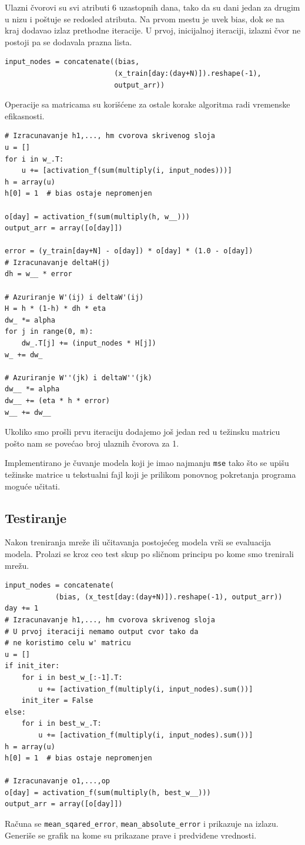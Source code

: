 \documentclass[a4paper]{article}
\begin{document}
Ulazni čvorovi su svi atributi 6 uzastopnih dana, tako da su dani jedan za drugim u nizu i poštuje se redosled atributa. Na prvom mestu je uvek bias, dok se na kraj dodavao izlaz prethodne iteracije. U prvoj, inicijalnoj iteraciji, izlazni čvor ne postoji pa se dodavala prazna lista.
\begin{verbatim}
input_nodes = concatenate((bias, 
                          (x_train[day:(day+N)]).reshape(-1), 
                          output_arr))
\end{verbatim}

Operacije sa matricama su korišćene za ostale korake algoritma radi vremenske efikasnosti.
\begin{verbatim}
# Izracunavanje h1,..., hm cvorova skrivenog sloja
u = []
for i in w_.T:
    u += [activation_f(sum(multiply(i, input_nodes)))]
h = array(u)
h[0] = 1  # bias ostaje nepromenjen

o[day] = activation_f(sum(multiply(h, w__)))
output_arr = array([o[day]])

error = (y_train[day+N] - o[day]) * o[day] * (1.0 - o[day])
# Izracunavanje deltaH(j)
dh = w__ * error

# Azuriranje W'(ij) i deltaW'(ij)
H = h * (1-h) * dh * eta
dw_ *= alpha
for j in range(0, m):
    dw_.T[j] += (input_nodes * H[j])
w_ += dw_

# Azuriranje W''(jk) i deltaW''(jk)
dw__ *= alpha
dw__ += (eta * h * error)
w__ += dw__
\end{verbatim}

Ukoliko smo prošli prvu iteraciju dodajemo još jedan red u težinsku matricu pošto nam se povećao broj ulaznih čvorova za 1.

Implementirano je čuvanje modela koji je imao najmanju \texttt{mse} tako što se upišu težinske matrice u tekstualni fajl koji je prilikom ponovnog pokretanja programa moguće učitati.

\subsection{Testiranje}
Nakon treniranja mreže ili učitavanja postojećeg modela vrši se evaluacija modela. Prolazi se kroz ceo test skup po sličnom principu po kome smo trenirali mrežu.
\begin{verbatim}
input_nodes = concatenate(
            (bias, (x_test[day:(day+N)]).reshape(-1), output_arr))
day += 1
# Izracunavanje h1,..., hm cvorova skrivenog sloja
# U prvoj iteraciji nemamo output cvor tako da 
# ne koristimo celu w' matricu
u = []
if init_iter:
    for i in best_w_[:-1].T:
        u += [activation_f(multiply(i, input_nodes).sum())]
    init_iter = False
else:
    for i in best_w_.T:
        u += [activation_f(multiply(i, input_nodes).sum())]
h = array(u)
h[0] = 1  # bias ostaje nepromenjen

# Izracunavanje o1,...,op
o[day] = activation_f(sum(multiply(h, best_w__)))
output_arr = array([o[day]])
\end{verbatim}
Računa se \texttt{mean\_sqared\_error}, \texttt{mean\_absolute\_error} i prikazuje na izlazu. Generiše se grafik na kome su prikazane prave i predviđene vrednosti.
\end{document}
